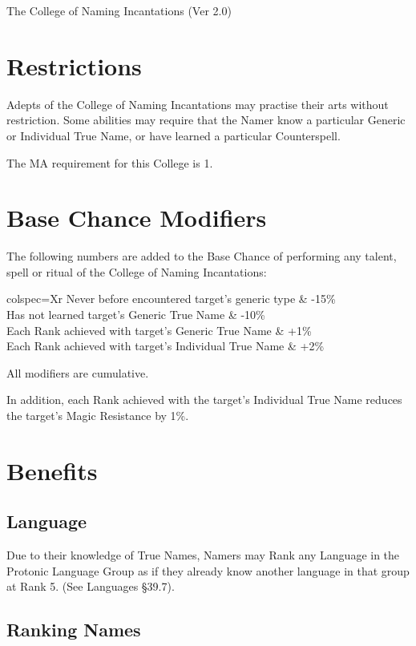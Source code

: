 \begin{Chapter}{The College of Naming Incantations (Ver 2.0)}
\section{Restrictions}

Adepts of the College of Naming Incantations may practise their arts
without restriction.  Some abilities may require that the Namer know a
particular Generic or Individual True Name, or have learned a
particular Counterspell.

The MA requirement for this College is 1. 


\section{Base Chance Modifiers}

The following numbers are added to the Base Chance of performing any
talent, spell or ritual of the College of Naming Incantations:

\begin{dqtblr}{colspec={Xr}}
Never before encountered target’s generic type		& -15\% \\
Has not learned target’s Generic True Name		& -10\% \\
Each Rank achieved with target’s Generic True Name	& +1\% \\
Each Rank achieved with target’s Individual True Name 	& +2\% \\
\end{dqtblr}

All modifiers are cumulative. 

In addition, each Rank achieved with the target’s Individual True Name
reduces the target’s Magic Resistance by 1\%.

\section{Benefits}

\subsection{Language}

Due to their knowledge of True Names, Namers may Rank any Language in
the Protonic Language Group as if they already know another language
in that group at Rank 5. (See Languages §39.7).

\subsection{Ranking Names}


\end{Chapter}
